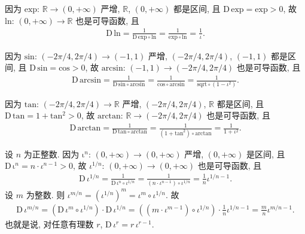 \begin{example}
    因为 $\mathrm{exp}$: $\mathbb{R} \to (0, +\infty)$ 严增,
    $\mathbb{R}$, $(0, +\infty)$ 都是区间,
    且 $\mathrm{D}\, \mathrm{exp} = \mathrm{exp} > 0$,
    故 $\mathrm{ln}$: $(0, +\infty) \to \mathbb{R}$
    也是可导函数, 且
    \begin{align*}
        \mathrm{D}\, \mathrm{ln} = \frac{1}{\mathrm{D}\, \mathrm{exp} \circ \mathrm{ln}} = \frac{1}{\mathrm{exp} \circ \mathrm{ln}} = \frac{1}{\iota}.
    \end{align*}

    因为 $\mathrm{sin}$: $(-2\pi/4, 2\pi/4) \to (-1, 1)$ 严增,
    $(-2\pi/4, 2\pi/4)$, $(-1, 1)$ 都是区间,
    且 $\mathrm{D}\, \mathrm{sin} = \mathrm{cos} > 0$,
    故 $\mathrm{arcsin}$: $(-1, 1) \to (-2\pi/4, 2\pi/4)$
    也是可导函数, 且
    \begin{align*}
        \mathrm{D}\, \mathrm{arcsin} = \frac{1}{\mathrm{D}\, \mathrm{sin} \circ \mathrm{arcsin}} = \frac{1}{\mathrm{cos} \circ \mathrm{arcsin}} = \frac{1}{\mathrm{sqrt} \circ (1 - \iota^2)}.
    \end{align*}

    因为 $\mathrm{tan}$: $(-2\pi/4, 2\pi/4) \to \mathbb{R}$ 严增,
    $(-2\pi/4, 2\pi/4)$, $\mathbb{R}$ 都是区间,
    且 $\mathrm{D}\, \mathrm{tan} = 1 + \mathrm{tan}^2 > 0$,
    故 $\mathrm{arctan}$: $\mathbb{R} \to (-2\pi/4, 2\pi/4)$
    也是可导函数, 且
    \begin{align*}
        \mathrm{D}\, \mathrm{arctan} = \frac{1}{\mathrm{D}\, \mathrm{tan} \circ \mathrm{arctan}} = \frac{1}{(1 + \mathrm{tan}^2) \circ \mathrm{arctan}} = \frac{1}{1 + \iota^2}.
    \end{align*}

    设 $n$ 为正整数.
    因为 $\mathrm{\iota}^n$: $(0, +\infty) \to (0, +\infty)$ 严增,
    $(0, +\infty)$ 是区间, 且
    $\mathrm{D}\, \mathrm{\iota}^n = n \cdot \iota^{n-1} > 0$,
    故 $\iota^{1/n}$: $(0, +\infty) \to (0, +\infty)$
    也是可导函数, 且
    \begin{align*}
        \mathrm{D}\, \iota^{1/n} = \frac{1}{\mathrm{D}\, \mathrm{\iota}^n \circ \iota^{1/n}} = \frac{1}{(n \cdot \iota^{n-1}) \circ \iota^{1/n}} = \frac{1}{n} \iota^{1/n - 1}.
    \end{align*}
    设 $m$ 为整数.
    则
    $\iota^{m/n} = (\iota^{1/n})^m = \iota^m \circ \iota^{1/n}$.
    故
    \begin{align*}
        \mathrm{D}\, \iota^{m/n} = ({\mathrm{D}\, \iota^m} \circ {\iota^{1/n}}) \cdot {\mathrm{D}\, \iota^{1/n}} = ((m \cdot \iota^{m-1}) \circ \iota^{1/n}) \cdot \frac{1}{n} \iota^{1/n - 1} = \frac{m}{n} \iota^{m/n - 1}.
    \end{align*}
    也就是说, 对任意有理数 $r$,
    $\mathrm{D}\, \iota^r = r\,\iota^{r - 1}$.
\end{example}

